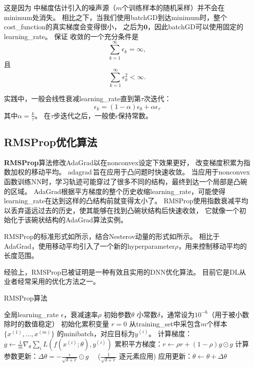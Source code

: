 这是因为\,\,中梯度估计引入的噪声源（$m$个训练样本的随机采样）并不会在\gls{minimum}处消失。
相比之下，当我们使用\gls{batch}\gls{GD}到达\gls{minimum}时，整个\gls{cost_function}的真实梯度会变得很小，
之后为$\mathbf{0}$，因此\gls{batch}\gls{GD}可以使用固定的\gls{learning_rate}。
保证\,\,收敛的一个充分条件是
\begin{equation}
\label{eq:8.12}
\sum_{k=1}^\infty \epsilon_k = \infty,
\end{equation}
且
\begin{equation}
\label{eq:8.13}
\sum_{k=1}^\infty \epsilon_k^2 < \infty.
\end{equation}

实践中，一般会线性衰减\gls{learning_rate}直到第$\tau$次迭代：
\begin{equation}
\label{eq:8.14}
\epsilon_k = (1-\alpha) \epsilon_0 + \alpha \epsilon_\tau
\end{equation}
其中$\alpha = \frac{k}{\tau}$。
在$\tau$步迭代之后，一般使$\epsilon$保持常数。

\subsection{RMSProp优化算法}
\label{sec:rmsprop}
\textbf{RMSProp}算法\citep{Hinton-ipam2012}修改AdaGrad以在\gls{nonconvex}设定下效果更好，
改变梯度积累为指数加权的移动平均。
\gls{adagrad}\,旨在应用于凸问题时快速收敛。
当应用于\gls{nonconvex}函数训练\gls{NN}时，学习轨迹可能穿过了很多不同的结构，最终到达一个局部是凸碗的区域。
AdaGrad根据平方梯度的整个历史收缩\gls{learning_rate}，可能使得\gls{learning_rate}在达到这样的凸结构前就变得太小了。
RMSProp使用指数衰减平均以丢弃遥远过去的历史，使其能够在找到凸碗状结构后快速收敛，
它就像一个初始化于该碗状结构的AdaGrad算法实例。

RMSProp的标准形式如所示，结合Nesterov动量的形式如所示。
相比于AdaGrad，使用移动平均引入了一个新的\gls{hyperparameter}$\rho$，用来控制移动平均的长度范围。

经验上，RMSProp已被证明是一种有效且实用的\gls{DNN}优化算法。
目前它是\gls{DL}从业者经常采用的优化方法之一。


\begin{algorithm}[ht]
	\caption{RMSProp算法}
	\label{alg:rms_prop}
	\begin{algorithmic}
		\REQUIRE 全局\gls{learning_rate} $\epsilon$，衰减速率$\rho$
		\REQUIRE  初始参数$\theta$
		\REQUIRE 小常数$\delta$，通常设为$10^{-6}$（用于被小数除时的数值稳定）
		\STATE 初始化累积变量 $r = 0$
		\STATE 从\gls{training_set}中采包含$m$个样本$\{ x^{(1)},\dots, x^{(m)}\}$ 的\gls{minibatch}，对应目标为$y^{(i)}$。
		\STATE 计算梯度：$g \leftarrow  
		\frac{1}{m} \nabla_{\theta} \sum_i L(f(x^{(i)};\theta),y^{(i)})$ 
		\STATE 累积平方梯度：$r \leftarrow \rho
		r + (1-\rho) g \odot g$
		\STATE 计算参数更新：$\Delta \theta =
		-\frac{\epsilon}{\sqrt{\delta + r}} \odot g$  \ \  ($\frac{1}{\sqrt{\delta + r}}$ 逐元素应用)
		\STATE 应用更新：$\theta \leftarrow \theta + \Delta \theta$
		\ENDWHILE
	\end{algorithmic}
\end{algorithm}

